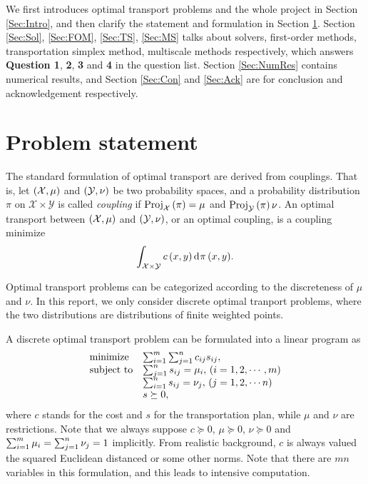 \documentclass[english]{pkupaper}
\begin{document}
We first introduces optimal transport problems and the whole project in Section \ref{Sec:Intro}, and then clarify the statement and formulation in Section \ref{Sec:ProSta}. Section \ref{Sec:Sol}, \ref{Sec:FOM}, \ref{Sec:TS}, \ref{Sec:MS} talks about solvers, first-order methods, transportation simplex method, multiscale methods respectively, which answers \textbf{Question 1}, \textbf{2}, \textbf{3} and \textbf{4} in the question list. Section \ref{Sec:NumRes} contains numerical results, and Section \ref{Sec:Con} and \ref{Sec:Ack} are for conclusion and acknowledgement respectively.

\section{Problem statement} \label{Sec:ProSta}

The standard formulation of optimal transport are derived from couplings. \parencite{Villani2009} That is, let $ \left(  \mathcal{X}, \mu  \right) $ and $ \left(  \mathcal{Y}, \nu  \right) $ be two probability spaces, and a probability distribution $\pi$ on $ \mathcal{X} \times \mathcal{Y} $ is called \emph{coupling} if $ \operatorname{\mathrm{Proj}}_{\mathcal{X}} \left( \pi \right) = \mu $ and $ \operatorname{\mathrm{Proj}}_{\mathcal{Y}} \left( \pi \right) \nu $. An optimal transport between $ \left(  \mathcal{X}, \mu  \right) $ and $ \left(  \mathcal{Y}, \nu  \right) $, or an optimal coupling, is a coupling minimize
\begin{equation}
\int_{ \mathcal{X} \times \mathcal{Y} }{ c \left(  x, y  \right) \mathop{\mathrm{d}^{} \!} \pi \left(  x, y  \right) }.
\end{equation}

Optimal transport problems can be categorized according to the discreteness of $\mu$ and $\nu$. In this report, we only consider discrete optimal tranport problems, where the two distributions are distributions of finite weighted points.

A discrete optimal transport problem can be formulated into a linear program as
\begin{equation} \label{Eq:StdLP}
\begin{array}{ll}
\mathrel{\text{{minimize}}} & \sum_{ {i} = {1} }^{m}{\sum_{ {j} = {1} }^{n}{ c_{ i j } s_{ i j } }}, \\
\mathrel{\text{{subject to}}} & \sum_{ {j} = {1} }^{n}{s_{ i j }} = \mu_i, \mathbin{}\left(  i = 1, 2, \cdots, m  \right) \\
& \sum_{ {i} = {1} }^{n}{s_{ i j }} = \nu_j, \mathbin{}\left(  j = 1, 2, \cdots n  \right) \\
& s \succeq 0,
\end{array}
\end{equation}
where $c$ stands for the cost and $s$ for the transportation plan, while $\mu$ and $\nu$ are restrictions. Note that we always suppose $ c \succeq 0 $, $ \mu \succeq 0 $, $ \nu \succeq 0 $ and $ \sum_{ {i} = {1} }^{m}{\mu_i} = \sum_{ {j} = {1} }^{n}{\nu_j} = 1 $ implicitly. From realistic background, $c$ is always valued the squared Euclidean distanced or some other norms. Note that there are $ m n $ variables in this formulation, and this leads to intensive computation.
\end{document}
